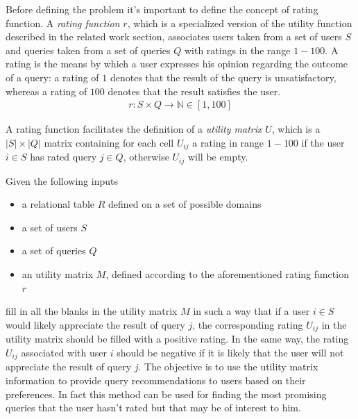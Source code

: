 \begin{definition}
    Before defining the problem it's important to define the concept of rating function. A \emph{rating function} $r$, which is a specialized version of the utility function described in the related work section, associates users taken from a set of users $S$ and queries taken from a set of queries $Q$ with ratings in the range $1-100$. A rating is the means by which a user expresses his opinion regarding the outcome of a query: a rating of $1$ denotes that the result of the query is unsatisfactory, whereas a rating of $100$ denotes that the result satisfies the user. 
    \begin{equation}
    \begin{aligned}
    r \colon S \times Q \to \mathbb{N} \in [1,100]
    \end{aligned}
    \end{equation}
    
    A rating function facilitates the definition of a \emph{utility matrix} $U$, which is a $|S| \times |Q|$ matrix containing for each cell $U_{ij}$ a rating in range $1-100$ if the user $i \in S$ has rated query $j \in Q$, otherwise $U_{ij}$ will be empty. 
\end{definition}



\begin{definition}
    Given the following inputs
    \begin{itemize}
        \item a relational table $R$ defined on a set of possible domains
        \item a set of users $S$
        \item a set of queries $Q$
        \item an utility matrix $M$, defined according to the aforementioned rating function $r$
    \end{itemize}
    fill in all the blanks in the utility matrix $M$ in such a way that if a user $i \in S$ would likely appreciate the result of query $j$, the corresponding rating $U_{ij}$ in the utility matrix should be filled with a positive rating. In the same way, the rating $U_{ij}$ associated with user $i$ should be negative if it is likely that the user will not appreciate the result of query $j$. 
    The objective is to use the utility matrix information to provide query recommendations to users based on their preferences. In fact this method can be used for finding the most promising queries that the user hasn't rated but that may be of interest to him. 

\end{definition}


